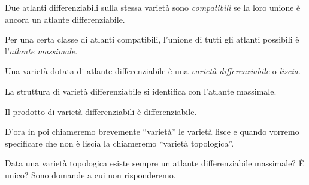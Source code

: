 \begin{defn}
	Due atlanti differenziabili sulla stessa varietà sono \emph{compatibili}
	se la loro unione è ancora un atlante differenziabile.
\end{defn}

\begin{defn}
	Per una certa classe di atlanti compatibili,
	l'unione di tutti gli atlanti possibili è l'\emph{atlante massimale}.
\end{defn}

\begin{defn}
	Una varietà dotata di atlante differenziabile è una \emph{varietà differenziabile} o \emph{liscia}.
\end{defn}

\begin{oss}
	La struttura di varietà differenziabile si identifica con l'atlante massimale.
\end{oss}

\begin{fat}
	Il prodotto di varietà differenziabili è differenziabile.
\end{fat}

D'ora in poi chiameremo brevemente ``varietà'' le varietà lisce
e quando vorremo specificare che non è liscia la chiameremo ``varietà topologica''.

Data una varietà topologica esiste sempre un atlante differenziabile massimale? È unico?
Sono domande a cui non risponderemo.
